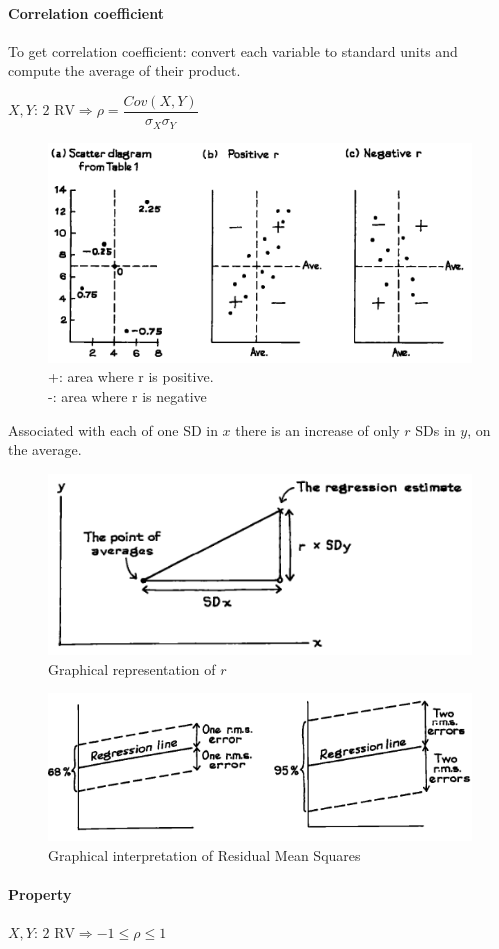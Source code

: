 \paragraph{Correlation coefficient}
To get correlation coefficient: convert each variable to standard units
and compute the average of their product.
\begin{center}
	$X,Y\text{: 2 RV}\Rightarrow \rho=\dfrac{Cov(X,Y)}{\sigma_{X}\sigma_{Y}}$
\end{center}
\begin{figure}[H]
	\begin{center}
		\includegraphics[width=.5\textwidth]{./chaps/17sec/images/correlationDiagram.png}
	\end{center}
	\caption{+: area where r is positive.\\-: area where r is 
	negative}
	\label{fig:7_correlationDiagram}
\end{figure}
Associated with each of one SD in $x$ there is an increase of only
$r$ SDs in $y$, on the average.
\begin{figure}[H]
	\begin{center}
		\includegraphics[width=.5\textwidth]{./chaps/17sec/images/2_correlDiag.png}
	\end{center}
	\caption{Graphical representation of $r$}
	\label{fig:2_correDiag}
\end{figure}
\begin{figure}[H]
	\begin{center}
		\includegraphics[width=.5\textwidth]{./chaps/17sec/images/3_residuals.png}
	\end{center}
	\caption{Graphical interpretation of Residual Mean Squares}
	\label{fig:3_rmsDiag}
\end{figure}
\paragraph{Property}
\begin{center}
	$X,Y\text{: 2 RV}\Rightarrow -1\leq \rho \leq 1$
\end{center}

